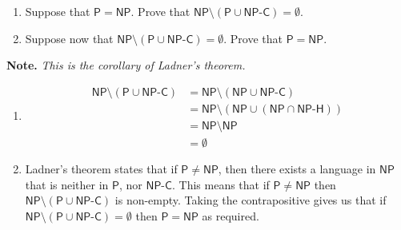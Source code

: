\documentclass{article}
\begin{document}
\begin{question}
\begin{enumerate}[label = (\alph*)]
    \item Suppose that $\mathsf P = \mathsf{NP}$. Prove that $\mathsf{NP} \setminus \left(\mathsf P \cup \mathsf{NP\text{-}C}\right) = \emptyset$.

    \item Suppose now that $\mathsf{NP} \setminus \left(\mathsf P \cup \mathsf{NP\text{-}C}\right) = \emptyset$. Prove that $\mathsf P = \mathsf{NP}$.
\end{enumerate}

{\bfseries Note.} {\em This is the corollary of Ladner's theorem.}
\end{question}

\begin{solution}
\begin{enumerate}[label = (\alph*)]
    \item 
    \begin{align*}
    \mathsf{NP} \setminus \left(\mathsf P \cup \mathsf{NP\text{-}C}\right) &= \mathsf{NP} \setminus (\mathsf{NP} \cup \mathsf{NP\text{-}C})\\
    &= \mathsf{NP} \setminus (\mathsf{NP} \cup (\mathsf{NP}\cap \mathsf{NP\text{-}H}))\\
    &= \mathsf{NP} \setminus \mathsf{NP}\\
    &= \emptyset
    \end{align*}

    \item 
    Ladner's theorem states that if $\mathsf{P}\neq \mathsf{NP}$, then there exists a language in $\mathsf{NP}$ that 
    is neither in $\mathsf{P}$, nor $\mathsf{NP\text{-}C}$.
    This means that if $\mathsf{P}\neq \mathsf{NP}$ then $\mathsf{NP} \setminus \left(\mathsf P \cup \mathsf{NP\text{-}C}\right)$ is non-empty. Taking the contrapositive gives us that if $\mathsf{NP} \setminus \left(\mathsf P \cup \mathsf{NP\text{-}C}\right)=\emptyset$ then $\mathsf{P} = \mathsf{NP}$ as required.
 
\end{enumerate}
\end{solution}
\end{document}
